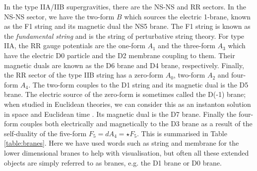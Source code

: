 In the type IIA/IIB supergravities, there are the NS-NS and RR sectors. In the NS-NS sector, we have the two-form $B$ which sources the electric 1-brane, known as the F1 string and its magnetic dual the NS5 brane. The F1 string is known as the \emph{fundamental string} and is the string of perturbative string theory. For type IIA, the RR gauge potentials are the one-form $A_1$ and the three-form $A_3$ which have the electric D0 particle and the D2 membrane coupling to them. Their magnetic duals are known as the D6 brane and D4 brane, respectively. Finally, the RR sector of the type IIB string has a zero-form $A_0$, two-form $A_2$ and four-form $A_4$. The two-form couples to the D1 string and its magnetic dual is the D5 brane. The electric source of the zero-form is sometimes called the D(-1) brane; when studied in Euclidean theories, we can consider this as an instanton solution in space and Euclidean time \cite{Becker:2007zj}. Its magnetic dual is the D7 brane. Finally the four-form couples both electrically and magnetically to the D3 brane as a result of the self-duality of the five-form $F_5 = dA_4 = \star F_5$. This is summarised in Table \ref{table:branes}. Here we have used words such as string and membrane for the lower dimensional branes to help with visualisation, but often all these extended objects are simply referred to as branes, e.g. the D1 brane or D0 brane.
 
